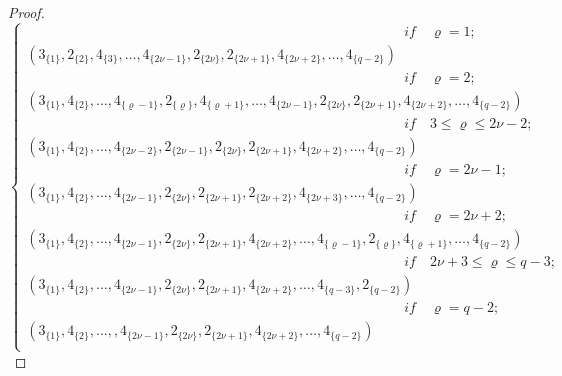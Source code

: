 \documentclass[]{interact}
\theoremstyle{plain}%
\theoremstyle{definition}
\theoremstyle{remark}
\begin{document}
\begin{proof}
\begin{equation*}
\begin{cases}
                   \qquad \qquad \qquad \qquad \qquad \qquad \qquad \qquad \qquad  \qquad \qquad\qquad\qquad\quad\textit{if}\quad\varrho= 1;\\
                     (3_{\{1\}},2_{\{ 2 \}},4_{\{3\}}, \ldots, 4_{\{2\nu-1\}},2_{\{2\nu\}},2_{\{2\nu+1\}},4_{\{2\nu+2\}},\ldots,4_{\{q-2\}})\\
                     \qquad \qquad \qquad \qquad \qquad \qquad \qquad \qquad \qquad  \qquad \qquad\qquad\qquad\quad\textit{if}\quad \varrho= 2;\\
                   (3_{\{1\}},4_{\{2\}}, \ldots,4_{\{\varrho-1 \}},2_{\{ \varrho \}},4_{\{\varrho +1\}}, \ldots, 4_{\{2\nu-1\}},2_{\{2\nu\}},2_{\{2\nu+1\}},4_{\{2\nu+2\}},\ldots,4_{\{q-2\}})\\
                   \qquad \qquad \qquad \qquad \qquad \qquad \qquad \qquad \qquad  \qquad \qquad\qquad\qquad\quad\textit{if}\quad  3 \leq  \varrho  \leq 2\nu-2  ;\\
                      (3_{\{1\}},4_{\{2\}}, \ldots,4_{\{2\nu-2 \}},2_{\{ 2\nu-1 \}},2_{\{2\nu\}},2_{\{2\nu+1\}},4_{\{2\nu+2\}},\ldots,4_{\{q-2\}})\\
                      \qquad \qquad \qquad \qquad \qquad \qquad \qquad \qquad \qquad  \qquad \qquad\qquad\qquad\quad\textit{if}\quad\varrho= 2\nu-1 ;\\
                     (3_{\{1\}},4_{\{2\}}, \ldots,4_{\{2\nu-1\}},2_{\{2\nu\}},2_{\{2\nu+1\}},2_{\{ 2\nu+2 \}}, 4_{\{2\nu+3 \}},\ldots,4_{\{q-2\}})\\
                     \qquad \qquad \qquad \qquad \qquad \qquad \qquad \qquad \qquad  \qquad \qquad\qquad\qquad\quad\textit{if}\quad  \varrho= 2\nu+2 ;\\
                    (3_{\{1\}},4_{\{2\}}, \ldots,4_{\{2\nu-1\}},2_{\{2\nu\}},2_{\{2\nu+1\}},4_{\{2\nu+2\}},\ldots,4_{\{\varrho-1 \}},2_{\{ \varrho \}},4_{\{\varrho +1\}},\ldots,4_{\{q-2\}})\\
                    \qquad \qquad \qquad \qquad \qquad \qquad \qquad \qquad \qquad  \qquad \qquad\qquad\qquad\quad\textit{if}\quad  2\nu+3 \leq  \varrho  \leq q-3  ;\\
                     (3_{\{1\}},4_{\{2\}}, \ldots,4_{\{2\nu-1\}},2_{\{2\nu\}},2_{\{2\nu+1\}},4_{\{2\nu+2\}},\ldots,4_{\{q-3 \}},2_{\{ q-2 \}})\\
                     \qquad \qquad \qquad \qquad \qquad \qquad \qquad \qquad \qquad  \qquad \qquad\qquad\qquad\quad\textit{if}\quad  \varrho=  q-2  ;\\
                    (3_{\{1\}},4_{\{2\}}, \ldots,,4_{\{2\nu-1\}},2_{\{2\nu\}},2_{\{2\nu+1\}},4_{\{2\nu+2\}},\ldots,4_{\{q-2\}})\\

\end{cases}
\end{equation*}
\end{proof}
\end{document}
